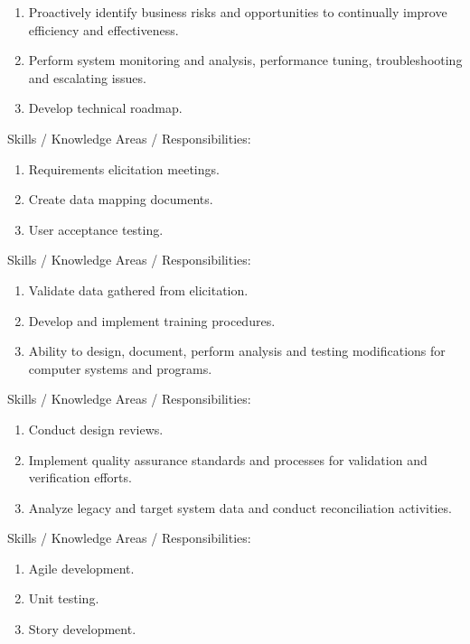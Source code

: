 \documentclass{article}
\begin{document}
\pagebreak
\begin{enumerate}
  \item Proactively identify business risks and opportunities to continually improve efficiency and effectiveness.
  \item Perform system monitoring and analysis, performance tuning, troubleshooting and escalating issues.
  \item Develop technical roadmap.
\end{enumerate}
Skills / Knowledge Areas / Responsibilities:
\begin{enumerate}
  \item Requirements elicitation meetings.
  \item Create data mapping documents.
  \item User acceptance testing.
\end{enumerate}
Skills / Knowledge Areas / Responsibilities:
\begin{enumerate}
  \item Validate data gathered from elicitation.
  \item Develop and implement training procedures.
  \item Ability to design, document, perform analysis and testing modifications for computer systems and programs.
\end{enumerate}
Skills / Knowledge Areas / Responsibilities:
\begin{enumerate}
  \item Conduct design reviews.
  \item Implement quality assurance standards and processes for validation and verification efforts.
  \item Analyze legacy and target system data and conduct reconciliation activities.
\end{enumerate}
Skills / Knowledge Areas / Responsibilities:
\begin{enumerate}
  \item Agile development.
  \item Unit testing.
  \item Story development.
\end{enumerate}
\end{document}
